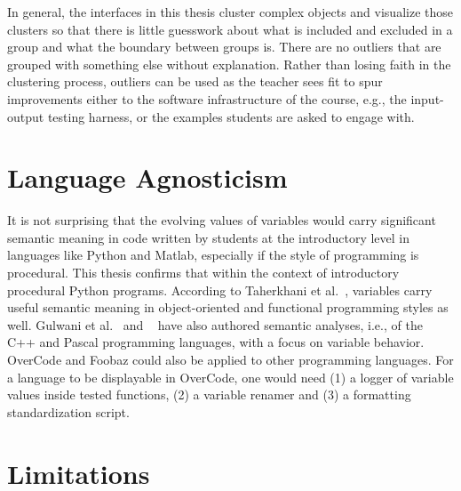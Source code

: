 
In general, the interfaces in this thesis cluster complex objects and visualize those clusters so that there is little guesswork about what is included and excluded in a group and what the boundary between groups is. There are no outliers that are grouped with something else without explanation. Rather than losing faith in the clustering process, outliers can be used as the teacher sees fit to spur improvements either to the software infrastructure of the course, e.g., the input-output testing harness, or the examples students are asked to engage with. 

\section{Language Agnosticism}

It is not surprising that the evolving values of variables would carry significant semantic meaning in code written by students at the introductory level in languages like Python and Matlab, especially if the style of programming is procedural. This thesis confirms that within the context of introductory procedural Python programs. According to Taherkhani et al.~\cite{taherkhani2010recognizing}, variables carry useful semantic meaning in object-oriented and functional programming styles as well. Gulwani et al.~\cite{gulwani_fse14} and ~\cite{sajaniemi2002empirical} have also authored semantic analyses, i.e., of the C++ and Pascal programming languages, with a focus on variable behavior. OverCode and Foobaz could also be applied to other programming languages. For a language to be displayable in OverCode, one would need (1) a logger of variable values inside tested functions, (2) a variable renamer and (3) a formatting standardization script.



\section{Limitations}

